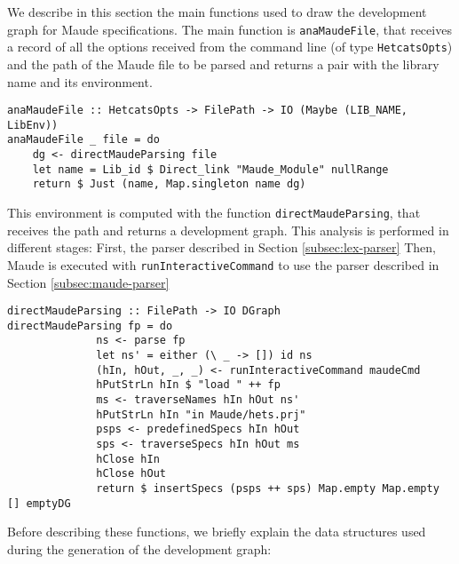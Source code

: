 
We describe in this section the main functions used to draw the
development graph for Maude specifications. The main function is
\verb"anaMaudeFile", that receives a record of all the options received
from the command line (of type \verb"HetcatsOpts") and the path of
the Maude file to be parsed and returns a pair with the library
name and its environment.

{\codesize
\begin{verbatim}
anaMaudeFile :: HetcatsOpts -> FilePath -> IO (Maybe (LIB_NAME, LibEnv))
anaMaudeFile _ file = do
    dg <- directMaudeParsing file
    let name = Lib_id $ Direct_link "Maude_Module" nullRange
    return $ Just (name, Map.singleton name dg)
\end{verbatim}
}

This environment is computed with the function
\verb"directMaudeParsing", that receives the path and returns
a development graph. This analysis is performed in different stages:
First, the parser described in Section \ref{subsec:lex-parser}
Then, Maude is executed with \verb"runInteractiveCommand" to use
the parser described in Section \ref{subsec:maude-parser}

{\codesize
\begin{verbatim}
directMaudeParsing :: FilePath -> IO DGraph
directMaudeParsing fp = do
              ns <- parse fp
              let ns' = either (\ _ -> []) id ns
              (hIn, hOut, _, _) <- runInteractiveCommand maudeCmd
              hPutStrLn hIn $ "load " ++ fp
              ms <- traverseNames hIn hOut ns'
              hPutStrLn hIn "in Maude/hets.prj"
              psps <- predefinedSpecs hIn hOut
              sps <- traverseSpecs hIn hOut ms
              hClose hIn
              hClose hOut
              return $ insertSpecs (psps ++ sps) Map.empty Map.empty [] emptyDG
\end{verbatim}
}

Before describing these functions,
we briefly explain the data structures used during the generation of
the development graph:

